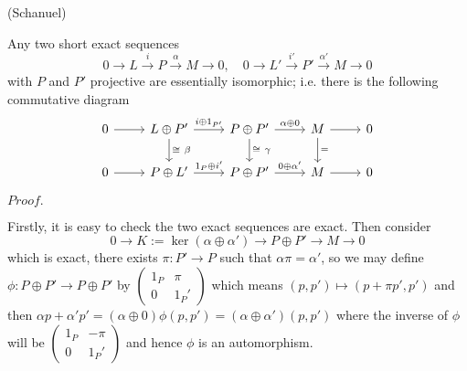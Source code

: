 \documentclass{article}
\newcommand{\Pf}[1]{$Proof.$\par}
\begin{document}
    \begin{lemma}
        (Schanuel)\par
        Any two short exact sequences
        \[0\to L \overset{i}{\to} P \overset{\alpha}{\to} M \to 0,\quad 0 \to L' \overset{i'}{\to} P' \overset{\alpha'}{\to} M \to 0\]
        with $P$ and $P'$ projective are essentially isomorphic; i.e. there is the following commutative diagram
        \[
        \begin{tikzcd}
            0\arrow[r] & L\oplus P'\arrow[r,"i\oplus 1_{P'}"]\arrow[d,"\cong\ \beta"] & P\oplus P'\arrow[r,"\alpha\oplus 0"]\arrow[d,"\cong\ \gamma"] & M\arrow[d,"="]\arrow[r] & 0 \\
            0\arrow[r] & P\oplus L'\arrow[r,"1_P\oplus i'"] & P\oplus P'\arrow[r,"0\oplus\alpha'"] & M\arrow[r] & 0
        \end{tikzcd}
        \]
    \end{lemma} 
    \Pf\par
        Firstly, it is easy to check the two exact sequences are exact. Then consider
        \[
        0 \to K:=\ker(\alpha\oplus\alpha') \to P\oplus P' \to M \to 0
        \]
        which is exact, there exists $\pi:P'\to P$ such that $\alpha\pi = \alpha'$, so we may define $\phi:P\oplus P' \to P\oplus P'$ by $\left(\begin{array}{cc}
        1_P & \pi \\
        0 & 1_P' 
        \end{array}\right)$ which means $(p,p')\mapsto (p+\pi p',p')$ and then $\alpha p+\alpha' p' = (\alpha\oplus 0)\phi(p,p') = (\alpha\oplus\alpha')(p,p')$ where the inverse of $\phi$ will be $\left(\begin{array}{cc}
        1_P & -\pi \\
        0 & 1_P' 
        \end{array}\right)$ and hence $\phi$ is an automorphism.
\newpage




\end{document}
